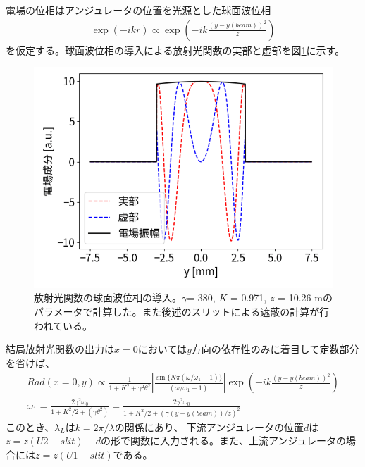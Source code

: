 \documentclass[a4paper,11pt,uplatex]{jsbook}
\begin{document}
電場の位相はアンジュレータの位置を光源とした球面波位相
\begin{align}
  \exp(-ikr) \propto \exp( -ik \frac{(y - y(beam))^2}{z})
\end{align}
を仮定する。球面波位相の導入による放射光関数の実部と虚部を図\ref{fig:phase}に示す。
\begin{figure}[h]
  \centering
  \includegraphics[width=0.8\linewidth]{image/2-phase.png}
  \caption[放射光関数の球面波位相]{放射光関数の球面波位相の導入。$\gamma$= 380, $K$ = 0.971, $z$ = 10.26 mのパラメータで計算した。また後述のスリットによる遮蔽の計算が行われている。}
  \label{fig:phase}
\end{figure}

結局放射光関数の出力は$x=0$においては$y$方向の依存性のみに着目して定数部分を省けば、
\begin{align}
  Rad(x=0, y) \propto \frac{1}{1 + K^2 +\gamma^2\theta^2}\left| \frac{\sin \{N\pi(\omega/\omega_1 -1)\}}{(\omega/\omega_1 -1)} \right| \exp( -ik \frac{(y-y(beam))^2}{z})\\
   \omega_1 = \frac{2\gamma^2\omega_0}{1+ K^2/2+(\gamma \theta^2)}  = \frac{2\gamma^2\omega_0}{1+ K^2/2+(\gamma (y-y(beam))/z)^2} 
\end{align}
このとき、$\lambda_L$は$k = 2\pi/\lambda$の関係にあり、
下流アンジュレータの位置$d$は$z = z(U2-slit) - d $の形で関数に入力される。また、上流アンジュレータの場合には$z = z(U1-slit)$である。
\end{document}
